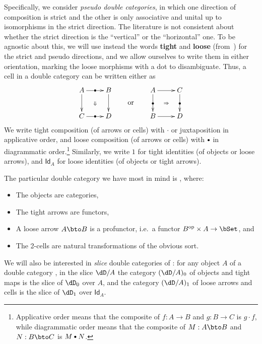\documentclass{amsart}
\let\tc\cdot
\newcommand{\bc}{\mathbin{\raisebox{1pt}{\scriptsize$\bullet$}}}
\newcommand{\hunit}[1]{\Id_{#1}}
\newcommand{\Id}{\mathsf{Id}}
\begin{document}
Specifically, we consider \emph{pseudo double categories}, in which one direction of composition is strict and the other is only associative and unital up to isomorphisms in the strict direction.
The literature is not consistent about whether the strict direction is the ``vertical'' or the ``horizontal'' one.
To be agnostic about this, we will use instead the words \textbf{tight} and \textbf{loose} (from~\cite{ls:limlax}) for the strict and pseudo directions, and we allow ourselves to write them in either orientation, marking the loose morphisms with a dot to disambiguate.
Thus, a cell in a double category can be written either as
\[ \vcenter{\xymatrix{ A \ar[r]|{\bullet} \ar[d] \ar@{}[dr]|{\Downarrow}& B \ar[d] \\ C \ar[r]|{\bullet} & D } }
\qquad\text{or}\qquad
\vcenter{\xymatrix{ A \ar[d]|{\bullet} \ar[r] \ar@{}[dr]|{\Rightarrow}& C \ar[d]|{\bullet} \\ B \ar[r] & D } }
\]
We write tight composition (of arrows or cells) with $\tc$ or juxtaposition in applicative order, and loose composition (of arrows or cells) with $\bc$ in diagrammatic order.\footnote{Applicative order means that the composite of $f:A\to B$ and $g:B\to C$ is $g\tc f$, while diagrammatic order means that the composite of $M:A\bto B$ and $N:B\bto C$ is $M\bc N$.}
Similarly, we write $1$ for tight identities (of objects or loose arrows), and $\hunit{A}$ for loose identities (of objects or tight arrows).

The particular double category we have most in mind is \dCat, where:
\begin{itemize}
\item The objects are categories,
\item The tight arrows are functors,
\item A loose arrow $A\bto B$ is a profunctor, i.e.\ a functor $B\op\times A\to\bSet$, and
\item The 2-cells are natural transformations of the obvious sort.
\end{itemize}
We will also be interested in \emph{slice} double categories of \dCat: for any object $A$ of a double category \dD, in the slice $\dD/A$ the category $(\dD/A)_0$ of objects and tight maps is the slice of $\dD_0$ over $A$, and the category $(\dD/A)_1$ of loose arrows and cells is the slice of $\dD_1$ over $\hunit A$.
\end{document}
